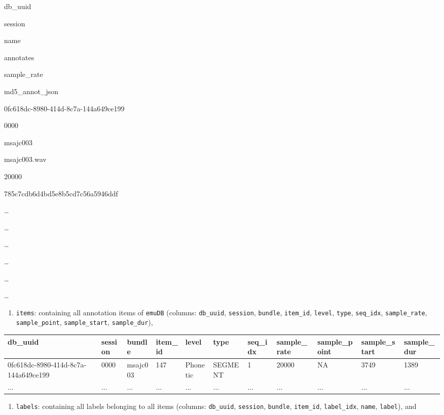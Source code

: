 \documentclass[]{book}
\providecommand{\tightlist}{%
  \setlength{\itemsep}{0pt}\setlength{\parskip}{0pt}}
\begin{document}
db\_uuid

session

name

annotates

sample\_rate

md5\_annot\_json

0fc618dc-8980-414d-8c7a-144a649ce199

0000

msajc003

msajc003.wav

20000

785c7cdb6d4bd5e8b5cd7c56a5946ddf

\ldots{}

\ldots{}

\ldots{}

\ldots{}

\ldots{}

\ldots{}

\begin{enumerate}
\def\labelenumi{\arabic{enumi}.}
\setcounter{enumi}{3}
\tightlist
\item
  \texttt{items}: containing all annotation items of \texttt{emuDB} (columns: \texttt{db\_uuid}, \texttt{session}, \texttt{bundle}, \texttt{item\_id}, \texttt{level}, \texttt{type}, \texttt{seq\_idx}, \texttt{sample\_rate}, \texttt{sample\_point}, \texttt{sample\_start}, \texttt{sample\_dur}),
\end{enumerate}

\begin{tabular}{l|l|l|l|l|l|l|l|l|l|l}
\hline
db\_uuid & session & bundle & item\_id & level & type & seq\_idx & sample\_rate & sample\_point & sample\_start & sample\_dur\\
\hline
0fc618dc-8980-414d-8c7a-144a649ce199 & 0000 & msajc003 & 147 & Phonetic & SEGMENT & 1 & 20000 & NA & 3749 & 1389\\
\hline
... & ... & ... & ... & ... & ... & ... & ... & ... & ... & ...\\
\hline
\end{tabular}

\begin{enumerate}
\def\labelenumi{\arabic{enumi}.}
\setcounter{enumi}{4}
\tightlist
\item
  \texttt{labels}: containing all labels belonging to all items (columns: \texttt{db\_uuid}, \texttt{session}, \texttt{bundle}, \texttt{item\_id}, \texttt{label\_idx}, \texttt{name}, \texttt{label}), and
\end{enumerate}
\end{document}
